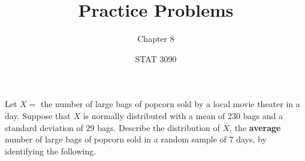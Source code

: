 \documentclass[noanswers]{exam}
\title{Practice Problems}
\author{Chapter 8}
\date{STAT 3090}
\begin{document}
%

\begin{questions} 
		
	\question Let $X=$ the number of large bags of popcorn sold by a local movie theater in a day. Suppose that $X$ is normally distributed with a mean of 230 bags and a standard deviation of 29 bags. Describe the distribution of $\overline{X}$, the \textbf{average} number of large bags of popcorn sold in a random sample of 7 days, by identifying the following.
	
	\vspace{3mm}
	
\end{questions}
\end{document}

